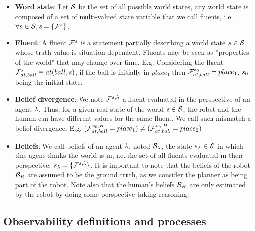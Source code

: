 \documentclass[letterpaper]{article} %
\begin{document}
\begin{itemize}

    \item \textbf{Word state}: Let $\mathcal{S}$ be the set of all possible world states, any world state is composed of a set of multi-valued state variable that we call fluents, i.e. $\forall s\in\mathcal{S}, s=\{ \mathcal{F}^{s}_{} \}$.
    
    \item \textbf{Fluent}: A fluent $\mathcal{F}^{s}_{}$ is a statement partially describing a world state $s\in\mathcal{S}$ whose truth value is situation dependent. Fluents may be seen as ''properties of the world" that may change over time.
    \subitem E.g. Considering the fluent $\mathcal{F}^{s}_{at, ball} \equiv at(ball, s)$, if the ball is initially in $place_1$ then $\mathcal{F}^{s_0}_{at,ball}=place_1$, $s_0$ being the initial state.
 
    
    \item \textbf{Belief divergence}: We note $\mathcal{F}^{s,\lambda}_{}$ a fluent evaluated in the perspective of an agent $\lambda$. Thus, for a given real state of the world $s\in\mathcal{S}$, the robot and the human can have different values for the same fluent. We call such mismatch a belief divergence.
    \subitem E.g. $(\mathcal{F}^{s_0,R}_{at,ball}=place_1) \neq (\mathcal{F}^{s_0,H}_{at,ball}=place_2)$
    
    \item \textbf{Beliefs}: We call beliefs of an agent $\lambda$, noted $\mathcal{B}_\lambda$, the state $s_\lambda\in\mathcal{S}$ in which this agent thinks the world is in, i.e. the set of all fluents evaluated in their perspective: $s_\lambda=\{ \mathcal{F}^{s,\lambda}_{} \}$. It is important to note that the beliefs of the robot $\mathcal{B}_R$ are assumed to be the ground truth, as we consider the planner as being part of the robot. Note also that the human's beliefs $\mathcal{B}_H$ are only estimated by the robot by doing some perspective-taking reasoning.
    
\end{itemize}

\subsection{Observability definitions and processes}
\end{document}
